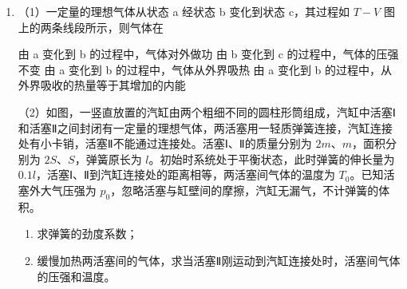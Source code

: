 \documentclass[\gkver]{gaokaozhenti}
\begin{document}
\begin{enumerate}
{联立解得 $v_{A}' = v_{0}$

方法一：设在斜面上滑行的长度为 $L$，上滑过程，根据动能定理可得 $-mgL\sin\theta - \mu mgL\cos\theta = 0 - \frac{1}{2}m(2v_{0})^{2}$

下滑过程，根据动能定理可得 $mgL\sin\theta - \mu mgL\cos\theta = \frac{1}{2}mv_{0}^{2} - 0$

联立解得 $\mu = 0.45$

方法二：根据牛顿第二定律，可以分别计算出滑块 A 上滑和下滑时的加速度，$mg\sin\theta + \mu mg\cos\theta = ma_{\text{上}}$，$mg\sin\theta - \mu mg\cos\theta = ma_{\text{下}}$

上滑时末速度为 0，下滑时初速度为 0，由匀变速直线运动的位移速度关系可得 $2a_{\text{上}}x = (2v_{0})^{2} - 0$，$2a_{\text{下}}x = v_{A}'^{2} = v_{0}^{2}$

联立可解得 $\mu = 0.45$
}

\item
（1）一定量的理想气体从状态 a 经状态 b 变化到状态 c，其过程如 $T-V$ 图上的两条线段所示，则气体在


{由 a 变化到 b 的过程中，气体对外做功}
{由 b 变化到 c 的过程中，气体的压强不变}
{由 a 变化到 b 的过程中，气体从外界吸热}
{由 a 变化到 b 的过程中，从外界吸收的热量等于其增加的内能}

（2）如图，一竖直放置的汽缸由两个粗细不同的圆柱形筒组成，汽缸中活塞Ⅰ和活塞Ⅱ之间封闭有一定量的理想气体，两活塞用一轻质弹簧连接，汽缸连接处有小卡销，活塞Ⅱ不能通过连接处。活塞Ⅰ、Ⅱ的质量分别为 $2m$、$m$，面积分别为 $2S$、$S$，弹簧原长为 $l$。初始时系统处于平衡状态，此时弹簧的伸长量为 $0.1l$，活塞Ⅰ、Ⅱ到汽缸连接处的距离相等，两活塞间气体的温度为 $T_{0}$。已知活塞外大气压强为 $p_{0}$，忽略活塞与缸壁间的摩擦，汽缸无漏气，不计弹簧的体积。
\begin{enumerate}
	\item
	求弹簧的劲度系数；
	\item
	缓慢加热两活塞间的气体，求当活塞Ⅱ刚运动到汽缸连接处时，活塞间气体的压强和温度。
\end{enumerate}


\end{enumerate}
\end{document}
